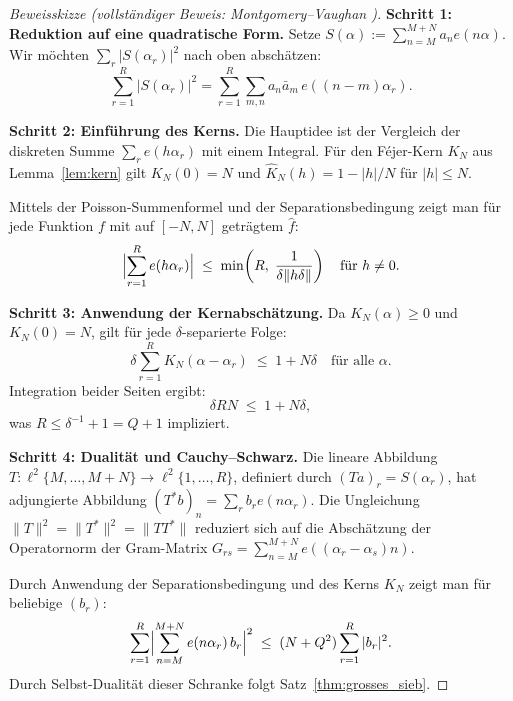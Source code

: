 \documentclass[12pt,a4paper]{amsart}
\theoremstyle{definition}
\newcommand{\eexp}[1]{e\!\left(#1\right)}
\begin{document}
\begin{proof}[Beweisskizze (vollständiger Beweis: Montgomery--Vaughan \cite{MV1973})]
  \textbf{Schritt 1: Reduktion auf eine quadratische Form.}
  Setze $S(\alpha) := \sum_{n=M}^{M+N}a_n\eexp{n\alpha}$.  Wir möchten
  $\sum_r |S(\alpha_r)|^2$ nach oben abschätzen:
  \[
    \sum_{r=1}^{R}|S(\alpha_r)|^{2}
    = \sum_{r=1}^{R}\sum_{m,n}a_n\bar{a}_m\,\eexp{(n-m)\alpha_r}.
  \]

  \textbf{Schritt 2: Einführung des Kerns.}
  Die Hauptidee ist der Vergleich der diskreten Summe $\sum_r \eexp{h\alpha_r}$
  mit einem Integral.  Für den Féjer-Kern $K_N$ aus Lemma~\ref{lem:kern}
  gilt $K_N(0) = N$ und $\hat{K}_N(h) = 1 - |h|/N$ für $|h| \leq N$.

  Mittels der Poisson-Summenformel und der Separationsbedingung zeigt man
  für jede Funktion $f$ mit auf $[-N,N]$ geträgtem $\hat{f}$:
  \[
    \Bigl|\sum_{r=1}^{R}\eexp{h\alpha_r}\Bigr|
    \;\leq\;
    \min\!\left(R,\; \frac{1}{\delta\|h\delta\|}\right)
    \quad \text{für } h \neq 0.
  \]

  \textbf{Schritt 3: Anwendung der Kernabschätzung.}
  Da $K_N(\alpha) \geq 0$ und $K_N(0) = N$, gilt für jede $\delta$-separierte
  Folge:
  \[
    \delta\sum_{r=1}^{R}K_N(\alpha - \alpha_r)
    \;\leq\; 1 + N\delta
    \quad\text{für alle }\alpha.
  \]
  Integration beider Seiten ergibt:
  \[
    \delta R N \;\leq\; 1 + N\delta,
  \]
  was $R \leq \delta^{-1} + 1 = Q + 1$ impliziert.

  \textbf{Schritt 4: Dualität und Cauchy--Schwarz.}
  Die lineare Abbildung $T\colon \ell^2\{M,\ldots,M+N\} \to \ell^2\{1,\ldots,R\}$,
  definiert durch $(Ta)_r = S(\alpha_r)$, hat adjungierte Abbildung
  $(T^* b)_n = \sum_r b_r \eexp{n\alpha_r}$.  Die Ungleichung
  $\|T\|^2 = \|T^*\|^2 = \|TT^*\|$ reduziert sich auf die Abschätzung der
  Operatornorm der Gram-Matrix $G_{rs} = \sum_{n=M}^{M+N} \eexp{(\alpha_r - \alpha_s)n}$.

  Durch Anwendung der Separationsbedingung und des Kerns $K_N$ zeigt man
  für beliebige $(b_r)$:
  \[
    \sum_{r=1}^{R}\Bigl|\sum_{n=M}^{M+N}\eexp{n\alpha_r}b_r\Bigr|^{2}
    \;\leq\;
    (N+Q^2)\sum_{r=1}^{R}|b_r|^{2}.
  \]
  Durch Selbst-Dualität dieser Schranke folgt Satz~\ref{thm:grosses_sieb}.


\end{proof}
\end{document}
